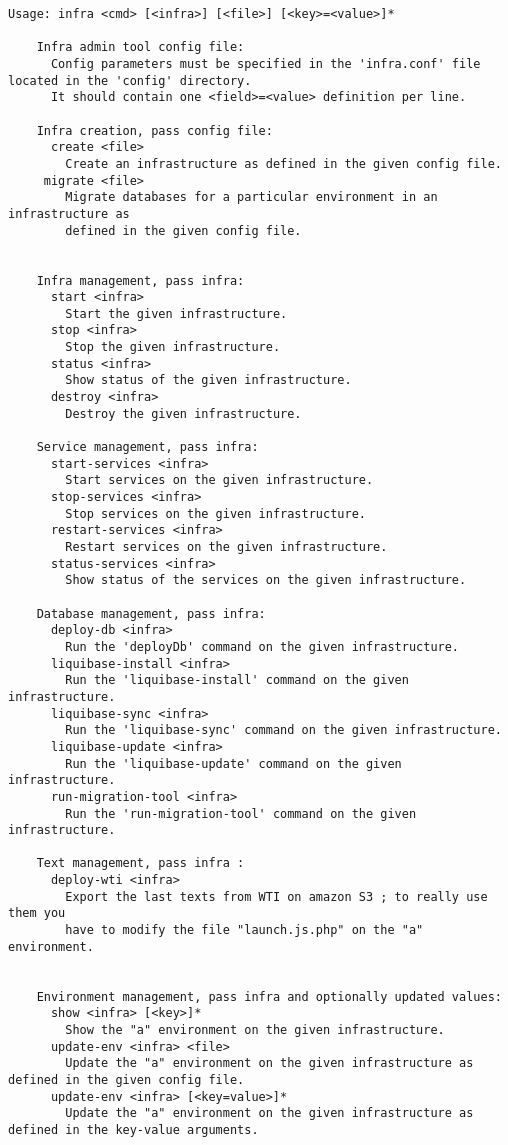 \begin{verbatim}
Usage: infra <cmd> [<infra>] [<file>] [<key>=<value>]*

    Infra admin tool config file:
      Config parameters must be specified in the 'infra.conf' file located in the 'config' directory.
      It should contain one <field>=<value> definition per line.

    Infra creation, pass config file:
      create <file>
        Create an infrastructure as defined in the given config file.
     migrate <file>
        Migrate databases for a particular environment in an infrastructure as
        defined in the given config file.


    Infra management, pass infra:
      start <infra>
        Start the given infrastructure.
      stop <infra>
        Stop the given infrastructure.
      status <infra>
        Show status of the given infrastructure.
      destroy <infra>
        Destroy the given infrastructure.

    Service management, pass infra:
      start-services <infra>
        Start services on the given infrastructure.
      stop-services <infra>
        Stop services on the given infrastructure.
      restart-services <infra>
        Restart services on the given infrastructure.
      status-services <infra>
        Show status of the services on the given infrastructure.

    Database management, pass infra:
      deploy-db <infra>
        Run the 'deployDb' command on the given infrastructure.
      liquibase-install <infra>
        Run the 'liquibase-install' command on the given infrastructure.
      liquibase-sync <infra>
        Run the 'liquibase-sync' command on the given infrastructure.
      liquibase-update <infra>
        Run the 'liquibase-update' command on the given infrastructure.
      run-migration-tool <infra>
        Run the 'run-migration-tool' command on the given infrastructure.

    Text management, pass infra :
      deploy-wti <infra>
        Export the last texts from WTI on amazon S3 ; to really use them you
        have to modify the file "launch.js.php" on the "a" environment.


    Environment management, pass infra and optionally updated values:
      show <infra> [<key>]*
        Show the "a" environment on the given infrastructure.
      update-env <infra> <file>
        Update the "a" environment on the given infrastructure as defined in the given config file.
      update-env <infra> [<key=value>]*
        Update the "a" environment on the given infrastructure as defined in the key-value arguments.


\end{verbatim}

